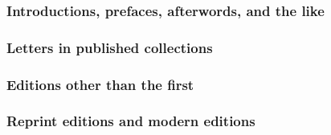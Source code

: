 \documentclass[11pt,letterpaper,oneside]{article}
\begin{document}
\begin{citebib}
\item \cite{bernard1990a}
\item \cite{updike1995a}
\end{citebib}

\subsubsection{Introductions, prefaces, afterwords, and the like}


\begin{citebib}
\item \cite{morrison2004b.f}
\item \cite{mansfield2000}
\end{citebib}

\subsubsection{Letters in published collections}

\begin{citebib}
\item \cite[133--34]{adams1867}
\item \cite{jackson1676}
\end{citebib}

\setcounter{subsubsection}{112}
\subsubsection{Editions other than the first}

\begin{citebib}
\item \cite[401--2]{einsohn2011}
\item \cite[101]{boudett2013}
\item \cite{strunk2000}
\end{citebib}

\subsubsection{Reprint editions and modern editions}
\label{14.114}
\end{document}
